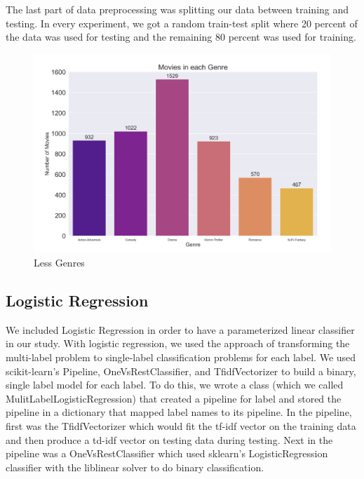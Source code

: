 \documentclass[sigconf]{acmart}
\begin{document}
The last part of data preprocessing was splitting our data between training and testing.  In every experiment, we got a random train-test split where 20 percent of the data was used for testing and the remaining 80 percent was used for training. 

\begin{figure}
	\includegraphics[width=\linewidth]{reduced_genres.png}
	\caption{Less Genres}
	\label{fig:less}
\end{figure}

\subsection{Logistic Regression}
We included Logistic Regression in order to have a parameterized linear classifier in our study. With logistic regression, we used the approach of transforming the multi-label problem to single-label classification problems for each label. We used scikit-learn's Pipeline, OneVsRestClassifier, and TfidfVectorizer to build a binary, single label model for each label.  To do this, we wrote a class (which we called MulitLabelLogisticRegression) that created a pipeline for label and stored the pipeline in a dictionary that mapped label names to its pipeline. In the pipeline, first was the TfidfVectorizer which would fit the tf-idf vector on the training data and then produce a td-idf vector on testing data during testing.  Next in the pipeline was a OneVsRestClassifier which used sklearn's LogisticRegression classifier with the liblinear solver to do binary classification. 
\end{document}
